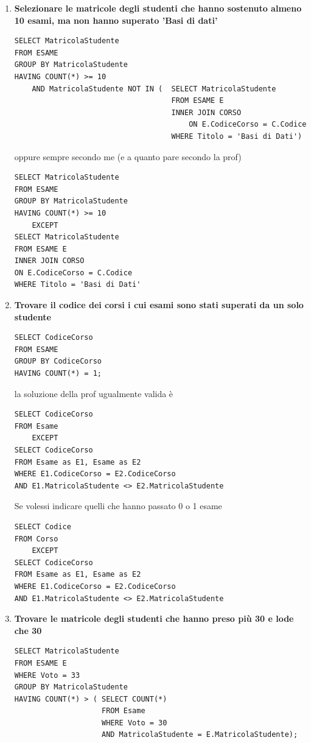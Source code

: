 \documentclass{article}
\begin{document}
\begin{enumerate}
\begin{lstlisting}[style=sqlstyle]
								FROM Esame
								WHERE Voto = 33)
\end{lstlisting}
devo stare attento a non usare $\neq 33$ in questo caso perché uno studente che ha preso 33 potrebbe aver preso anche un voto diverso da 33.
\item \textbf{Selezionare le matricole degli studenti che hanno sostenuto almeno 10 esami, ma non hanno superato 'Basi di dati'}
\begin{lstlisting}[style=sqlstyle]
SELECT MatricolaStudente
FROM ESAME
GROUP BY MatricolaStudente
HAVING COUNT(*) >= 10
	AND MatricolaStudente NOT IN (	SELECT MatricolaStudente
									FROM ESAME E
									INNER JOIN CORSO
										ON E.CodiceCorso = C.Codice
									WHERE Titolo = 'Basi di Dati')
\end{lstlisting}
oppure sempre secondo me (e a quanto pare secondo la prof)
\begin{lstlisting}[style=sqlstyle]
SELECT MatricolaStudente
FROM ESAME
GROUP BY MatricolaStudente
HAVING COUNT(*) >= 10
	EXCEPT
SELECT MatricolaStudente
FROM ESAME E
INNER JOIN CORSO
ON E.CodiceCorso = C.Codice
WHERE Titolo = 'Basi di Dati'
\end{lstlisting}
\item \textbf{Trovare il codice dei corsi i cui esami sono stati superati da un solo studente}
\begin{lstlisting}[style=sqlstyle]
SELECT CodiceCorso 
FROM ESAME 
GROUP BY CodiceCorso
HAVING COUNT(*) = 1;
\end{lstlisting}
la soluzione della prof ugualmente valida è
\begin{lstlisting}[style=sqlstyle]
SELECT CodiceCorso
FROM Esame
	EXCEPT
SELECT CodiceCorso
FROM Esame as E1, Esame as E2
WHERE E1.CodiceCorso = E2.CodiceCorso
AND E1.MatricolaStudente <> E2.MatricolaStudente
\end{lstlisting}

Se volessi indicare quelli che hanno passato 0 o 1 esame
\begin{lstlisting}[style=sqlstyle]
SELECT Codice
FROM Corso
	EXCEPT
SELECT CodiceCorso
FROM Esame as E1, Esame as E2
WHERE E1.CodiceCorso = E2.CodiceCorso
AND E1.MatricolaStudente <> E2.MatricolaStudente
\end{lstlisting}
\item \textbf{Trovare le matricole degli studenti che hanno preso più 30 e lode che 30}

\begin{lstlisting}[style=sqlstyle]
SELECT MatricolaStudente
FROM ESAME E
WHERE Voto = 33
GROUP BY MatricolaStudente
HAVING COUNT(*) > (	SELECT COUNT(*)
					FROM Esame 
					WHERE Voto = 30
					AND MatricolaStudente = E.MatricolaStudente);
\end{lstlisting}
\end{enumerate}
\end{document}
